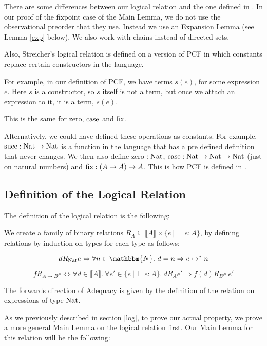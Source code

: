 There are some differences between our logical relation and the one defined in \citep{Streicher06}. In our proof of the fixpoint case of the Main Lemma, we do not use the observational preorder that they use. Instead we use an Expansion Lemma (see Lemma \ref{exp} below). We also work with chains instead of directed sets.

Also, Streicher's logical relation is defined on a version of PCF in which  constants replace certain constructors in the language.

For example, in our definition of PCF, we have terms $s(e)$, for some expression $e$. Here $s$ is a constructor, so $s$ itself is not a term, but once we attach an expression to it, it is a term, $s(e)$.

This is the same for zero, $\operatorname{case}$ and $\operatorname{fix}$.

Alternatively, we could have defined these operations as constants. For example, $\operatorname{succ} : \operatorname{Nat} \to \operatorname{Nat}$ is a function in the language that has a pre defined definition that never changes. We then also define zero $: \operatorname{Nat}$, $\operatorname{case} : \operatorname{Nat} \to \operatorname{Nat} \to \operatorname{Nat}$ (just on natural numbers) and $\operatorname{fix} : (A \to A) \to A$. This is how PCF is defined in \citep{Streicher06}.
 
\subsection{Definition of the Logical Relation}
The definition of the logical relation is the following:

\vspace{0.5cm}

\begin{defn}
We create a family of binary  relations $R_A \subseteq \llbracket A \rrbracket \times \{e \ | \ \vdash e : A \}$, by defining relations by induction on types for each type as follows:

\[ d  R_{\nat}  e \Leftrightarrow \forall n \in \mathbbm{N}. \ d = n \Rightarrow e \mapsto^* n\]

\[f  R_{A \to B}  e \Leftrightarrow \forall d \in \llbracket A \rrbracket. \ \forall e' \in \{ e \ | \ \vdash e : A\}. \ d R_A e' \Rightarrow f(d) R_B  e \ e'\]

\end{defn}

The forwards direction of Adequacy is given by the definition of the relation on expressions of type $\operatorname{Nat}$.

As we previously described in section \ref{log}, to prove our actual property, we prove a more general Main Lemma on the logical relation first. Our Main Lemma for this relation will be the following:

